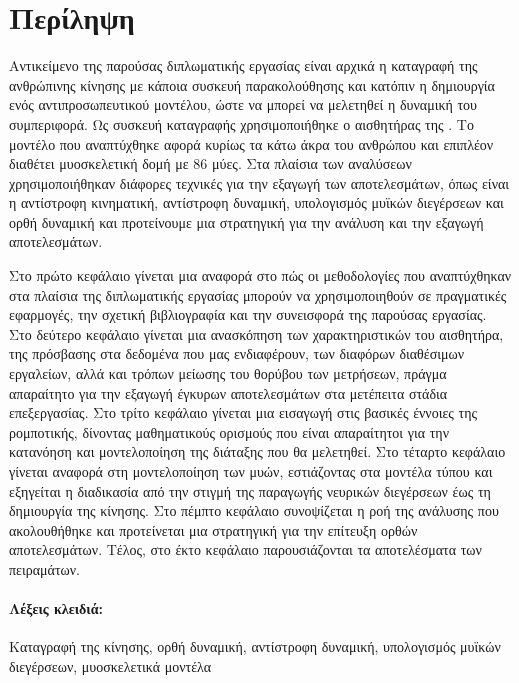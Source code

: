\section*{Περίληψη}

Αντικείμενο της παρούσας διπλωματικής εργασίας είναι αρχικά η καταγραφή της ανθρώπινης κίνησης με κάποια συσκευή παρακολούθησης και κατόπιν η δημιουργία ενός αντιπροσωπευτικού μοντέλου, ώστε να μπορεί να μελετηθεί η δυναμική του συμπεριφορά. Ως συσκευή καταγραφής χρησιμοποιήθηκε ο αισθητήρας  της . Το μοντέλο που αναπτύχθηκε αφορά κυρίως τα κάτω άκρα του ανθρώπου και επιπλέον διαθέτει μυοσκελετική δομή με 86 μύες. Στα πλαίσια των αναλύσεων χρησιμοποιήθηκαν διάφορες τεχνικές για την εξαγωγή των αποτελεσμάτων, όπως είναι η αντίστροφη κινηματική, αντίστροφη δυναμική, υπολογισμός μυϊκών διεγέρσεων και ορθή δυναμική και προτείνουμε μια στρατηγική για την ανάλυση και την εξαγωγή αποτελεσμάτων.

Στο πρώτο κεφάλαιο γίνεται μια αναφορά στο πώς οι μεθοδολογίες που αναπτύχθηκαν στα πλαίσια της διπλωματικής εργασίας μπορούν να χρησιμοποιηθούν σε πραγματικές εφαρμογές, την σχετική βιβλιογραφία και την συνεισφορά της παρούσας εργασίας. Στο δεύτερο κεφάλαιο γίνεται μια ανασκόπηση των χαρακτηριστικών του αισθητήρα, της πρόσβασης στα δεδομένα που μας ενδιαφέρουν, των διαφόρων διαθέσιμων εργαλείων, αλλά και τρόπων μείωσης του θορύβου των μετρήσεων, πράγμα απαραίτητο για την εξαγωγή έγκυρων αποτελεσμάτων στα μετέπειτα στάδια επεξεργασίας. Στο τρίτο κεφάλαιο γίνεται μια εισαγωγή στις βασικές έννοιες της ρομποτικής, δίνοντας μαθηματικούς ορισμούς που είναι απαραίτητοι για την κατανόηση και μοντελοποίηση της διάταξης που θα μελετηθεί. Στο τέταρτο κεφάλαιο γίνεται αναφορά στη μοντελοποίηση των μυών, εστιάζοντας στα μοντέλα τύπου  και εξηγείται η διαδικασία από την στιγμή της παραγωγής νευρικών διεγέρσεων έως τη δημιουργία της κίνησης. Στο πέμπτο κεφάλαιο συνοψίζεται η ροή της ανάλυσης που ακολουθήθηκε και προτείνεται μια στρατηγική για την επίτευξη ορθών αποτελεσμάτων. Τέλος, στο έκτο κεφάλαιο παρουσιάζονται τα αποτελέσματα των πειραμάτων.

\vfill

\paragraph{\textbf{Λέξεις κλειδιά:}}Καταγραφή της κίνησης, ορθή δυναμική, αντίστροφη δυναμική, υπολογισμός μυϊκών διεγέρσεων, μυοσκελετικά μοντέλα

